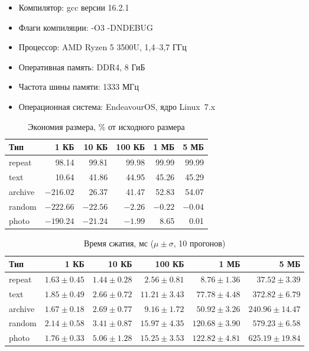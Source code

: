 \documentclass[a4paper]{article}
\begin{document}
\begin{itemize}
    \item Компилятор: gcc версии 16.2.1
    \item Флаги компиляции: -O3 -DNDEBUG
    \item Процессор: AMD Ryzen 5 3500U, 1{,}4--3{,}7 ГГц
    \item Оперативная память: DDR4, 8 ГиБ
    \item Частота шины памяти: 1333 МГц
    \item Операционная система: EndeavourOS, ядро Linux~7.x
\end{itemize}

\begin{table}[H]
\centering
\small
\caption{Экономия размера, \% от исходного размера}
\label{tab:ratio}
\begin{tabular}{lrrrrr}
\toprule
Тип & 1 КБ & 10 КБ & 100 КБ & 1 МБ & 5 МБ \\
\midrule
repeat  & 98.14 & 99.81 & 99.98 & 99.99 & 99.99 \\
text    & 10.64 & 41.86 & 44.95 & 45.26  & 45.29  \\
archive & $-216.02$ & 26.37 & 41.47 & 52.83 & 54.07 \\
random  & $-222.66$ & $-22.56$ & $-2.26$ & $-0.22$ & $-0.04$ \\
photo   & $-190.24$ & $-21.24$ & $-1.99$ & 8.65 & 0.01 \\
\bottomrule
\end{tabular}
\end{table}

\begin{table}[H]
\centering
\small
\caption{Время сжатия, мс ($\mu \pm \sigma$, 10 прогонов)}
\label{tab:compress}
\begin{tabular}{lrrrrr}
\toprule
Тип & 1 КБ & 10 КБ & 100 КБ & 1 МБ & 5 МБ \\
\midrule
repeat  & $1.63 \pm 0.45$ & $1.44 \pm 0.28$ & $2.56 \pm 0.81$ & $8.76 \pm 1.36$ & $37.52 \pm 3.39$ \\
text    & $1.85 \pm 0.49$ & $2.66 \pm 0.72$ & $11.21 \pm 3.43$ & $77.78 \pm 4.48$ & $372.82 \pm 6.79$ \\
archive & $1.67 \pm 0.18$ & $2.69 \pm 0.77$ & $9.16 \pm 1.72$ & $50.92 \pm 3.26$ & $240.96 \pm 14.47$ \\
random  & $2.14 \pm 0.58$ & $3.41 \pm 0.87$ & $15.97 \pm 4.35$ & $120.68 \pm 3.90$ & $579.23 \pm 6.58$ \\
photo   & $1.76 \pm 0.33$ & $5.06 \pm 1.28$ & $15.25 \pm 3.53$ & $122.82 \pm 4.81$ & $625.19 \pm 19.84$ \\
\bottomrule
\end{tabular}
\end{table}
\end{document}
